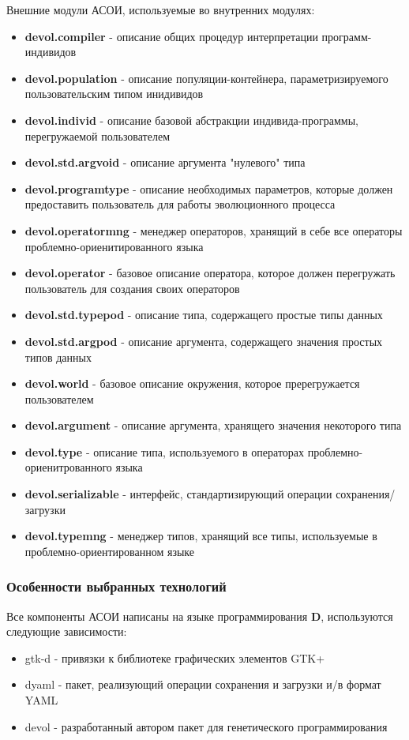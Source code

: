 \documentclass[russian,utf8,emptystyle]{eskdtext}
\begin{document}
\begin{spacing}{1.5}
Внешние модули АСОИ, используемые во внутренних модулях:
\begin{itemize}
\item \textbf{devol.compiler} - описание общих процедур интерпретации программ-индивидов
\item \textbf{devol.population} - описание популяции-контейнера, параметризируемого пользовательским типом инидивидов
\item \textbf{devol.individ} - описание базовой абстракции индивида-программы, перегружаемой пользователем
\item \textbf{devol.std.argvoid} - описание аргумента "нулевого" типа
\item \textbf{devol.programtype} - описание необходимых параметров, которые должен предоставить пользователь для работы эволюционного процесса
\item \textbf{devol.operatormng} - менеджер операторов, хранящий в себе все операторы проблемно-ориенитированного языка
\item \textbf{devol.operator} - базовое описание оператора, которое должен перегружать пользователь для создания своих операторов
\item \textbf{devol.std.typepod} - описание типа, содержащего простые типы данных
\item \textbf{devol.std.argpod} - описание аргумента, содержащего значения простых типов данных
\item \textbf{devol.world} - базовое описание окружения, которое пререгружается пользователем
\item \textbf{devol.argument} - описание аргумента, хранящего значения некоторого типа
\item \textbf{devol.type} - описание типа, используемого в операторах проблемно-ориенитрованного языка
\item \textbf{devol.serializable} - интерфейс, стандартизирующий операции сохранения/загрузки
\item \textbf{devol.typemng} - менеджер типов, хранящий все типы, используемые в проблемно-ориентированном языке
\end{itemize}

\subsubsection{Особенности выбранных технологий}
Все компоненты АСОИ написаны на языке программирования \textbf{D}, используются следующие зависимости:
\begin{itemize}
\item gtk-d - привязки к библиотеке графических элементов GTK+
\item dyaml - пакет, реализующий операции сохранения и загрузки и/в формат YAML
\item devol - разработанный автором пакет для генетического программирования
\end{itemize}


\end{spacing}
\end{document}
